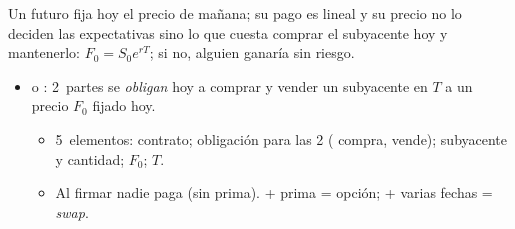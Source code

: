 \documentclass{article}
\begin{document}
\begin{columnas}
\begin{itemize}
\end{itemize}

\begin{ideaclave}
Un futuro fija hoy el precio de mañana; su pago es lineal y su precio no lo deciden las expectativas sino lo que cuesta comprar el subyacente hoy y mantenerlo: $F_0=S_0e^{rT}$; si no, alguien ganaría sin riesgo.
\end{ideaclave}

\begin{itemize}
\item {} o : 2~partes se \emph{obligan} hoy a comprar y vender un subyacente en $T$ a un precio $F_0$ fijado hoy.
  \begin{itemize}
  \item 5~elementos: contrato; obligación para las 2 ( compra,  vende); subyacente y cantidad; $F_0$; $T$.
  \item Al firmar nadie paga (sin prima). + prima = opción; + varias fechas = \emph{swap}.
  \end{itemize}
\end{itemize}


\end{columnas}
\end{document}
